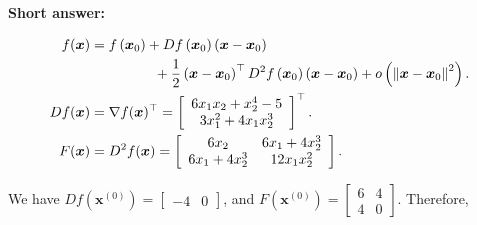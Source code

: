\textbf{Short answer:}

\begin{equation*}
	\begin{aligned}
		f(\boldsymbol{x}) & =f\left(\boldsymbol{x}_{0}\right)+D f\left(\boldsymbol{x}_{0}\right)\left(\boldsymbol{x}-\boldsymbol{x}_{0}\right) \\
		 	  & \hspace{1.6cm} +\frac{1}{2}\left(\boldsymbol{x}-\boldsymbol{x}_{0}\right)^{\top} 
		 	  	D^{2} f\left(\boldsymbol{x}_{0}\right)\left(\boldsymbol{x}-\boldsymbol{x}_{0}\right)+o\left(\left\|\boldsymbol{x}-\boldsymbol{x}_{0}\right\|^{2}\right) . \\
		Df(\boldsymbol{x}) & =\nabla f(\boldsymbol{x})^{\top}
			= \left[\begin{array}{c}
			6 x_{1} x_{2}+x_{2}^{4}-5 \\
			3 x_{1}^{2}+4 x_{1} x_{2}^{3}
			\end{array}\right]^{\top} . \\
		F(\boldsymbol{x}) & =D^{2} f(\boldsymbol{x})=
			\left[\begin{array}{cc}
			6 x_{2} & 6 x_{1}+4 x_{2}^{3} \\
			6 x_{1}+4 x_{2}^{3} & 12 x_{1} x_{2}^{2}
			\end{array}\right] .
	\end{aligned}
\end{equation*}

We have \(D f\left(\boldsymbol{x}^{(0)}\right)=\left[\begin{array}{ll}-4 & 0\end{array}\right]\), and \(F\left(\boldsymbol{x}^{(0)}\right)=\left[\begin{array}{ll}6 & 4 \\ 4 & 0\end{array}\right]\). Therefore,

